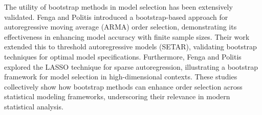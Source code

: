 \documentclass[ijoc,sglanonrev]{informs4}
\begin{document}
The utility of bootstrap methods in model selection has been extensively validated. Fenga and Politis \citep{fenga2011bootstrap} introduced a bootstrap-based approach for autoregressive moving average (ARMA) order selection, demonstrating its effectiveness in enhancing model accuracy with finite sample sizes. Their work \citep{fenga2013bootstrap} extended this to threshold autoregressive models (SETAR), validating bootstrap techniques for optimal model specifications. Furthermore, Fenga and Politis \citep{fenga2017lasso} explored the LASSO technique for sparse autoregression, illustrating a bootstrap framework for model selection in high-dimensional contexts. These studies collectively show how bootstrap methods can enhance order selection across statistical modeling frameworks, underscoring their relevance in modern statistical analysis.

\end{document}
